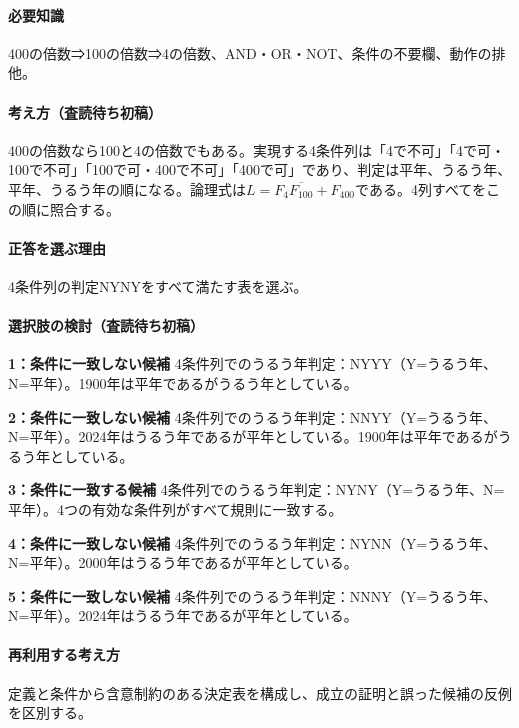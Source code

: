\paragraph{必要知識} 400の倍数⇒100の倍数⇒4の倍数、AND・OR・NOT、条件の不要欄、動作の排他。

\paragraph{考え方（査読待ち初稿）} 400の倍数なら100と4の倍数でもある。実現する4条件列は「4で不可」「4で可・100で不可」「100で可・400で不可」「400で可」であり、判定は平年、うるう年、平年、うるう年の順になる。論理式は\(L=F_4\overline{F_{100}}+F_{400}\)である。4列すべてをこの順に照合する。

\paragraph{正答を選ぶ理由} 4条件列の判定NYNYをすべて満たす表を選ぶ。

\paragraph{選択肢の検討（査読待ち初稿）}\mbox{}\par

\noindent\textbf{1：条件に一致しない候補} 4条件列でのうるう年判定：NYYY（Y=うるう年、N=平年）。1900年は平年であるがうるう年としている。\par

\noindent\textbf{2：条件に一致しない候補} 4条件列でのうるう年判定：NNYY（Y=うるう年、N=平年）。2024年はうるう年であるが平年としている。1900年は平年であるがうるう年としている。\par

\noindent\textbf{3：条件に一致する候補} 4条件列でのうるう年判定：NYNY（Y=うるう年、N=平年）。4つの有効な条件列がすべて規則に一致する。\par

\noindent\textbf{4：条件に一致しない候補} 4条件列でのうるう年判定：NYNN（Y=うるう年、N=平年）。2000年はうるう年であるが平年としている。\par

\noindent\textbf{5：条件に一致しない候補} 4条件列でのうるう年判定：NNNY（Y=うるう年、N=平年）。2024年はうるう年であるが平年としている。\par

\paragraph{再利用する考え方} 定義と条件から含意制約のある決定表を構成し、成立の証明と誤った候補の反例を区別する。


